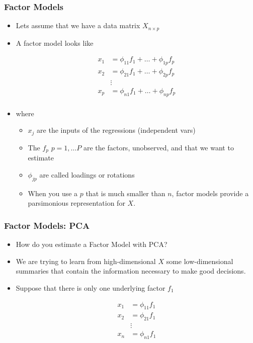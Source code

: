 \documentclass[
  shownotes,
  xcolor={svgnames},
  hyperref={colorlinks,citecolor=DarkBlue,linkcolor=DarkRed,urlcolor=DarkBlue}
  , aspectratio=169]{beamer}
\begin{document}
\begin{frame}
\frametitle{Factor Models}

\begin{itemize}
  \item Lets assume that we have a data matrix $X_{n\times p}$
  \medskip
\item A factor model looks like 

\begin{align}
x_{1}&=  \phi_{11} f_{1} + \dots + \phi_{1p} f_{p} \\ \nonumber
x_{2}&=  \phi_{21} f_{1} + \dots + \phi_{2p} f_{p} \\ \nonumber
&\vdots  \\ \nonumber
x_{p} &=  \phi_{n1} f_{1} + \dots + \phi_{np} f_{p} \\ \nonumber
\end{align}

\item where 
  \begin{itemize}
    \footnotesize
   \item $x_{j}$ are the inputs of the regressions (independent vars)
   \medskip
   \item The $f_{p}$ $p=1,\dots P$ are the factors, unobserved, and that we want to estimate
  \medskip
   \item $\phi_{jp}$  are called loadings or rotations
  \medskip
   \item When you use a $p$ that is much smaller than $n$, factor models provide a parsimonious representation for $X$. 
   
  \end{itemize}


\end{itemize}
\end{frame}
\begin{frame}
\frametitle{Factor Models: PCA}

\begin{itemize}
\item How do you estimate a Factor Model with PCA?
\medskip
\item We are trying to learn from high-dimensional $X$ some low-dimensional summaries that contain the information necessary to make good decisions. 
\pause
\medskip
\item Suppose that there is only one underlying factor $f_1$
\medskip

\begin{align}
x_{1}&=  \phi_{11} f_{1} \\ \nonumber
x_{2}&=  \phi_{21} f_{1} \\ \nonumber
&\vdots  \\ \nonumber
x_{n} &=  \phi_{n1} f_{1} \\ \nonumber
\end{align}


\end{itemize}
\end{frame}
\end{document}
